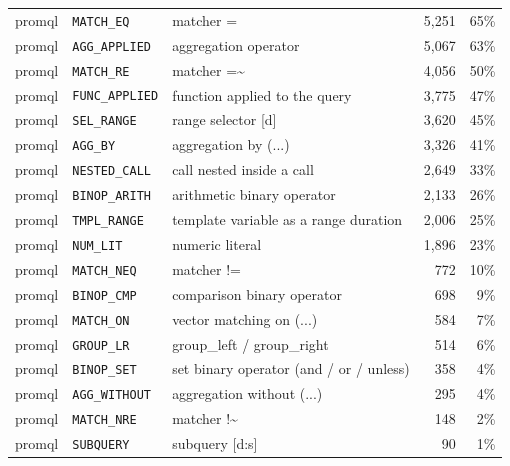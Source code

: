 \begin{tabular}{@{}lllrr@{}}
promql & \texttt{MATCH\_EQ} & matcher = & 5,251 & 65\% \\
promql & \texttt{AGG\_APPLIED} & aggregation operator & 5,067 & 63\% \\
promql & \texttt{MATCH\_RE} & matcher =\textasciitilde{} & 4,056 & 50\% \\
promql & \texttt{FUNC\_APPLIED} & function applied to the query & 3,775 & 47\% \\
promql & \texttt{SEL\_RANGE} & range selector [d] & 3,620 & 45\% \\
promql & \texttt{AGG\_BY} & aggregation by (...) & 3,326 & 41\% \\
promql & \texttt{NESTED\_CALL} & call nested inside a call & 2,649 & 33\% \\
promql & \texttt{BINOP\_ARITH} & arithmetic binary operator & 2,133 & 26\% \\
promql & \texttt{TMPL\_RANGE} & template variable as a range duration & 2,006 & 25\% \\
promql & \texttt{NUM\_LIT} & numeric literal & 1,896 & 23\% \\
promql & \texttt{MATCH\_NEQ} & matcher != & 772 & 10\% \\
promql & \texttt{BINOP\_CMP} & comparison binary operator & 698 & 9\% \\
promql & \texttt{MATCH\_ON} & vector matching on (...) & 584 & 7\% \\
promql & \texttt{GROUP\_LR} & group\_left / group\_right & 514 & 6\% \\
promql & \texttt{BINOP\_SET} & set binary operator (and / or / unless) & 358 & 4\% \\
promql & \texttt{AGG\_WITHOUT} & aggregation without (...) & 295 & 4\% \\
promql & \texttt{MATCH\_NRE} & matcher !\textasciitilde{} & 148 & 2\% \\
promql & \texttt{SUBQUERY} & subquery [d:s] & 90 & 1\% \\
\bottomrule
\end{tabular}
